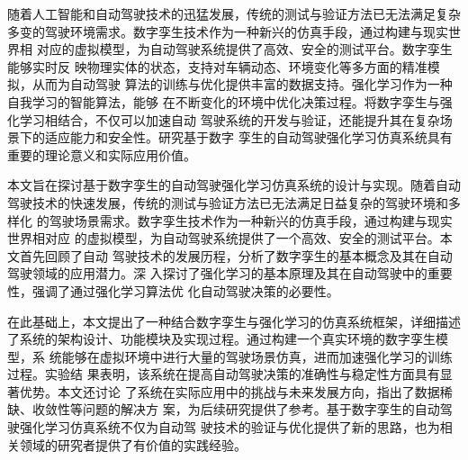 \begin{abstractzh}

    随着人工智能和自动驾驶技术的迅猛发展，传统的测试与验证方法已无法满足复杂
    多变的驾驶环境需求。数字孪生技术作为一种新兴的仿真手段，通过构建与现实世界相
    对应的虚拟模型，为自动驾驶系统提供了高效、安全的测试平台。数字孪生能够实时反
    映物理实体的状态，支持对车辆动态、环境变化等多方面的精准模拟，从而为自动驾驶
    算法的训练与优化提供丰富的数据支持。强化学习作为一种自我学习的智能算法，能够
    在不断变化的环境中优化决策过程。将数字孪生与强化学习相结合，不仅可以加速自动
    驾驶系统的开发与验证，还能提升其在复杂场景下的适应能力和安全性。研究基于数字
    孪生的自动驾驶强化学习仿真系统具有重要的理论意义和实际应用价值。
    
    本文旨在探讨基于数字孪生的自动驾驶强化学习仿真系统的设计与实现。随着自动
    驾驶技术的快速发展，传统的测试与验证方法已无法满足日益复杂的驾驶环境和多样化
    的驾驶场景需求。数字孪生技术作为一种新兴的仿真手段，通过构建与现实世界相对应
    的虚拟模型，为自动驾驶系统提供了一个高效、安全的测试平台。本文首先回顾了自动
    驾驶技术的发展历程，分析了数字孪生的基本概念及其在自动驾驶领域的应用潜力。深
    入探讨了强化学习的基本原理及其在自动驾驶中的重要性，强调了通过强化学习算法优
    化自动驾驶决策的必要性。
    
    在此基础上，本文提出了一种结合数字孪生与强化学习的仿真系统框架，详细描述
    了系统的架构设计、功能模块及实现过程。通过构建一个真实环境的数字孪生模型，系
    统能够在虚拟环境中进行大量的驾驶场景仿真，进而加速强化学习的训练过程。实验结
    果表明，该系统在提高自动驾驶决策的准确性与稳定性方面具有显著优势。本文还讨论
    了系统在实际应用中的挑战与未来发展方向，指出了数据稀缺、收敛性等问题的解决方
    案，为后续研究提供了参考。基于数字孪生的自动驾驶强化学习仿真系统不仅为自动驾
    驶技术的验证与优化提供了新的思路，也为相关领域的研究者提供了有价值的实践经验。
    

\end{abstractzh}